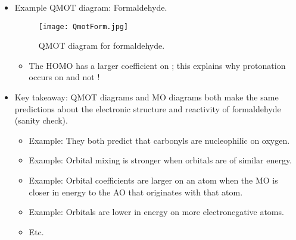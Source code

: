 \documentclass[../notes.tex]{subfiles}
\begin{document}
\begin{itemize}
\begin{itemize}
\begin{itemize}
\begin{itemize}
                \item Triplet is \ang{136}, and singlet is \ang{105}, so the triplet is more linear and the singlet is more bent! The triplet has reactivity more characteristic of the linear orbital picture, and the singlet has reactivity more characteristic of the bent orbital picture.
                \item The triplet is more favored by \SI[per-mode=symbol]{9}{\kilo\calorie\per\mole}
            \end{itemize}
        \end{itemize}
    \end{itemize}
    \item Example QMOT diagram: Formaldehyde.
    \begin{figure}[h!]
        \centering
        \texttt{[image: QmotForm.jpg]}
        \caption{QMOT diagram for formaldehyde.}
        \label{fig:QmotForm}
    \end{figure}
    \begin{itemize}
        \item The HOMO has a larger coefficient on ; this explains why protonation occurs on  and not !
    \end{itemize}
    \item Key takeaway: QMOT diagrams and MO diagrams both make the same predictions about the electronic structure and reactivity of formaldehyde (sanity check).
    \begin{itemize}
        \item Example: They both predict that carbonyls are nucleophilic on oxygen.
        \item Example: Orbital mixing is stronger when orbitals are of similar energy.
        \item Example: Orbital coefficients are larger on an atom when the MO is closer in energy to the AO that originates with that atom.
        \item Example: Orbitals are lower in energy on more electronegative atoms.
        \item Etc.
    \end{itemize}
\end{itemize}
\end{document}

